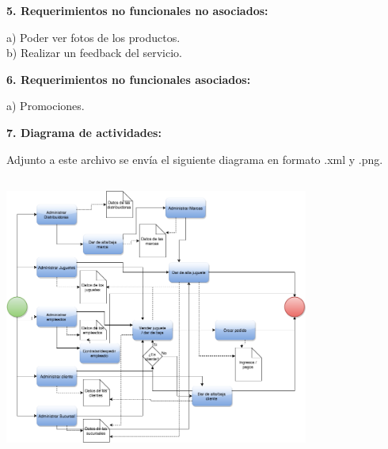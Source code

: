 \documentclass[letterpaper,11pt]{article}
\begin{document}
 

 \begin{center}
   {\bf 5. Requerimientos no funcionales no asociados: }
 \end{center}

 a) Poder ver fotos de los productos. \\
 b) Realizar un feedback del servicio. \\
 

 \begin{center}
   {\bf 6. Requerimientos no funcionales asociados: }
 \end{center}

 a) Promociones. \\
 
 \begin{center}
   {\bf 7. Diagrama de actividades: }
  
 \end{center}
 Adjunto a este archivo se envía el siguiente diagrama en formato .xml y .png.
 \\
 
  {\raggedleft{}  \includegraphics[width=10cm, height=10cm]{Diagrama_actividades} }
   
 
\end{document}
